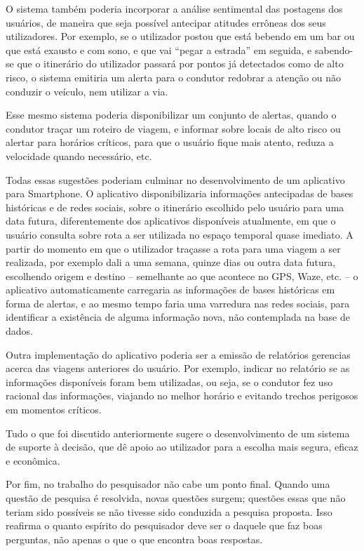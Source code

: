 O sistema também poderia incorporar a análise sentimental das postagens dos usuários, de maneira que seja possível antecipar atitudes errôneas dos seus utilizadores. Por exemplo, se o utilizador postou que está bebendo em um bar ou que está exausto e com sono, e que vai ``pegar a estrada'' em seguida, e sabendo-se que o itinerário do utilizador passará por pontos já detectados como de alto risco, o sistema emitiria um alerta para o condutor redobrar a atenção ou não conduzir o veículo, nem utilizar a via.

Esse mesmo sistema poderia disponibilizar um conjunto de alertas, quando o condutor traçar um roteiro de viagem, e informar sobre locais de alto risco ou alertar para horários críticos, para que o usuário fique mais atento, reduza a velocidade quando necessário, etc. 

Todas essas sugestões poderiam culminar no desenvolvimento de um aplicativo para Smartphone. O aplicativo disponibilizaria informações antecipadas de bases históricas e de redes sociais, sobre o itinerário escolhido pelo usuário para uma data futura, diferentemente dos aplicativos disponíveis atualmente, em que o usuário consulta sobre rota a ser utilizada no espaço temporal quase imediato. A partir do momento em que o utilizador traçasse a rota para uma viagem a ser realizada, por exemplo dali a uma semana, quinze dias ou outra data futura, escolhendo origem e destino -- semelhante ao que acontece no GPS, Waze, etc. -- o aplicativo automaticamente carregaria as informações de bases históricas em forma de alertas, e ao mesmo tempo faria uma varredura nas redes sociais, para identificar a existência de alguma informação nova, não contemplada na base de dados. 

Outra implementação do aplicativo poderia ser a emissão de relatórios gerencias acerca das viagens anteriores do usuário. Por exemplo, indicar no relatório se as informações disponíveis foram bem utilizadas, ou seja, se o condutor fez uso racional das informações, viajando no melhor horário e evitando trechos perigosos em momentos críticos.

Tudo o que foi discutido anteriormente sugere o desenvolvimento de um sistema de suporte à decisão, que dê apoio ao utilizador para a escolha mais segura, eficaz e econômica. 

Por fim, no trabalho do pesquisador não cabe um ponto final. Quando uma questão de pesquisa é resolvida, novas questões surgem; questões essas que não teriam sido possíveis se não tivesse sido conduzida a pesquisa proposta. Isso reafirma o quanto espírito do pesquisador deve ser o daquele que faz boas perguntas, não apenas o que o que encontra boas respostas. 




